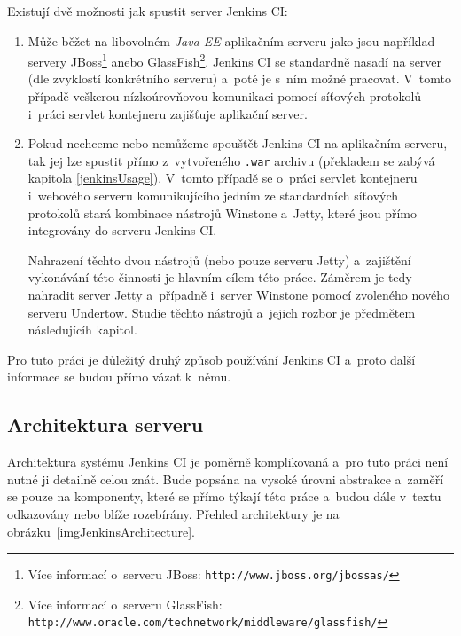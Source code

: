             \medskip \noindent
            Existují dvě možnosti jak spustit server Jenkins CI:

            \begin{enumerate}
                \item{Může běžet na libovolném \emph{Java EE} aplikačním serveru \cite{jenkinsServers} jako jsou například servery 
                JBoss\footnote{Více informací o~serveru JBoss: \texttt{http://www.jboss.org/jbossas/}} 
                anebo GlassFish\footnote{Více informací o~serveru GlassFish: \texttt{http://www.oracle.com/technetwork/middleware/glassfish/}}}.
                Jenkins CI se standardně nasadí na server (dle zvyklostí konkrétního serveru)
                a~poté je s~ním možné pracovat. V~tomto případě veškerou nízkoúrovňovou komunikaci pomocí síťových protokolů 
                i~práci servlet kontejneru zajišťuje aplikační server.
                
                \item{Pokud nechceme nebo nemůžeme spouštět Jenkins CI na aplikačním serveru, tak jej lze spustit přímo
                    z~vytvořeného \texttt{.war} archivu (překladem se zabývá kapitola \ref{jenkinsUsage}). V~tomto případě
                    se o~práci servlet kontejneru i~webového serveru komunikujícího jedním ze standardních síťových protokolů stará 
                    kombinace nástrojů Winstone a~Jetty, které jsou přímo integrovány do serveru Jenkins CI. 
                    
                    Nahrazení těchto dvou nástrojů (nebo pouze serveru Jetty) a~zajištění vykonávání této činnosti je hlavním cílem této práce.
                    Záměrem je tedy nahradit server Jetty a~případně i~server Winstone pomocí zvoleného nového serveru Undertow.
                    Studie těchto nástrojů a~jejich rozbor je předmětem následujícíh kapitol.}
            \end{enumerate}

            Pro tuto práci je důležitý druhý způsob používání Jenkins CI a~proto další informace se budou přímo vázat k~němu.

         \subsection{Architektura serveru}   \label{secJenkinsArchitektura}
            Architektura systému Jenkins CI je poměrně komplikovaná a~pro tuto práci není nutné ji detailně celou znát.
            Bude popsána na vysoké úrovni abstrakce a~zaměří se pouze na komponenty, které se přímo týkají této práce
            a~budou dále v~textu odkazovány nebo blíže rozebírány. Přehled architektury je na obrázku~\ref{imgJenkinsArchitecture}.
       
